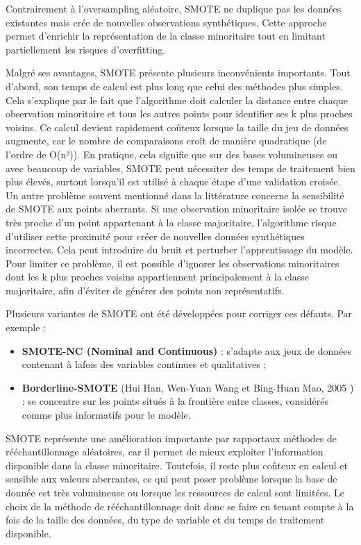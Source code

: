 \documentclass[a4paper,12pt]{article}
\begin{document}
 Contrairement à l’oversampling aléatoire, SMOTE ne duplique pas les données existantes mais crée de nouvelles observations synthétiques.  Cette approche permet d’enrichir la représentation de la classe minoritaire tout en limitant
  partiellement les risques d’overfitting.\medskip

Malgré ses avantages, SMOTE présente plusieurs inconvénients importants. Tout d’abord, son temps de calcul est plus long que celui des méthodes plus simples. Cela s’explique par le fait que l’algorithme doit calculer la distance
entre chaque observation minoritaire et tous les autres points pour identifier ses k plus proches voisins. Ce calcul devient rapidement coûteux lorsque la taille du jeu de données augmente, car le nombre de comparaisons croît de manière quadratique (de l’ordre de O(n²)). En pratique, cela signifie que sur des bases volumineuses ou avec beaucoup de variables, SMOTE peut nécessiter des temps de traitement bien plus élevés,
surtout lorsqu’il est utilisé à chaque étape d’une validation croisée.
Un autre problème souvent mentionné dans la littérature concerne la sensibilité de SMOTE aux points aberrants. Si une observation minoritaire isolée se trouve très proche d’un point appartenant à la classe majoritaire, l’algorithme risque d’utiliser cette proximité
pour créer de nouvelles données synthétiques incorrectes. Cela peut introduire du bruit et perturber l’apprentissage du modèle. Pour limiter ce problème, il est possible d’ignorer les observations minoritaires dont les k plus proches voisins appartiennent principalement
 à la classe majoritaire, afin d’éviter de générer des points non représentatifs.\medskip


Plusieurs variantes de SMOTE ont été développées pour corriger ces défauts.
Par exemple :
\begin{itemize}
    \item \textbf{SMOTE-NC (Nominal and Continuous)} : s’adapte aux jeux de données contenant à lafois des variables continues et qualitatives ;
    \item \textbf{Borderline-SMOTE} (Hui Han, Wen-Yuan Wang et Bing-Huan Mao, 2005 ) : se concentre sur les points situés à la frontière entre classes, considérés comme plus informatifs pour le modèle.
\end{itemize}

SMOTE représente une amélioration importante par rapportaux méthodes de rééchantillonnage aléatoires, car il permet de mieux exploiter l’information disponible dans la classe minoritaire. Toutefois, il reste plus coûteux en calcul et sensible aux valeurs aberrantes, ce qui peut poser problème lorsque la base de donnée est très volumineuse ou lorsque les ressources de calcul sont limitées. Le choix de la méthode de rééchantillonnage doit donc se faire en tenant compte à la fois de la taille des données, du type de variable et du temps de traitement disponible.
\end{document}
